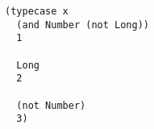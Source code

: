 \begin{lstlisting}[style=reclojureClojure]
(typecase x
  (and Number (not Long))
  1

  Long
  2

  (not Number)
  3)
\end{lstlisting}

